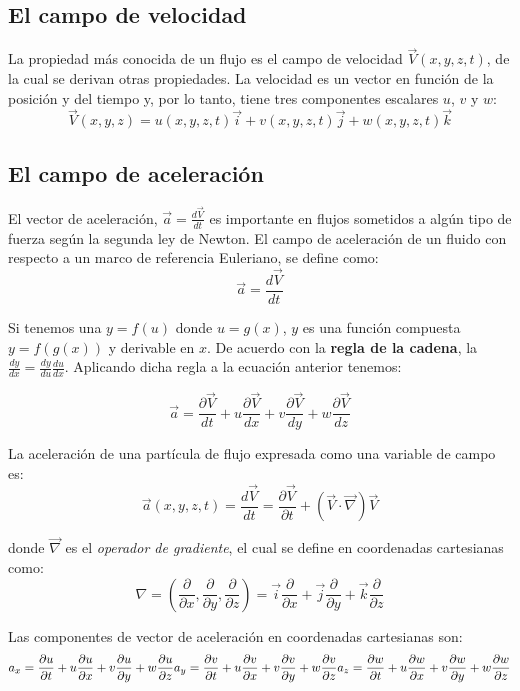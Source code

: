 \documentclass[10pt, oneside]{article}
\begin{document}
\subsection{El campo de velocidad}
La propiedad más conocida de un flujo es el campo de velocidad $\vec{V}(x,y,z,t)$, de la cual se derivan otras propiedades. La velocidad es un vector en función de la posición y del tiempo y, por lo tanto, tiene tres componentes escalares $u$, $v$ y $w$:
$$
\vec{V}(x,y,z)=u(x,y,z,t)\vec{i} + v(x,y,z,t)\vec{j} + w(x,y,z,t)\vec{k}
$$

\subsection{El campo de aceleración}
El vector de aceleración, $\vec{a}=\frac{d \vec{V}}{dt}$ es importante en flujos sometidos a algún tipo de fuerza según la segunda ley de Newton. El campo de aceleración de un fluido con respecto a un marco de referencia Euleriano, se define como:
$$
\vec{a}=\frac{d \vec{V}}{dt}
$$

Si tenemos una  $y=f(u)$ donde $u=g(x)$, $y$ es una función compuesta $y=f(g(x))$ y derivable en $x$. De acuerdo con la \textbf{regla de la cadena}, la $\frac{dy}{dx}=\frac{dy}{du} \frac{du}{dx}$. Aplicando dicha regla a la ecuación anterior tenemos: 

$$
\vec{a}=\frac{\partial \vec{V}}{dt} + u\frac{\partial \vec{V}}{dx} + v\frac{\partial \vec{V}}{dy} + w\frac{\partial \vec{V}}{dz}
$$

La aceleración de una partícula de flujo expresada como una variable de campo es:
\begin{equation}
\vec a(x,y,z,t) = \frac{d \vec{V}}{dt} = \frac{\partial \vec{V}}{\partial t} + (\vec{V} \cdot \vec{\nabla})\vec{V}
\label{ace}
\end{equation}

donde $\vec{\nabla}$ es el \emph{operador de gradiente}, el cual se define en coordenadas cartesianas como:
$$
\nabla = \left( \frac{\partial}{\partial x} , \frac{\partial}{\partial y}, \frac{\partial}{\partial z} \right) = \vec{i}\frac{\partial}{\partial x} +\vec{j}\frac{\partial}{\partial y}  + \vec{k}\frac{\partial}{\partial z}
$$

Las componentes de vector de aceleración en coordenadas cartesianas son:
$$
a_x = \frac{\partial u}{\partial t} + u\frac{\partial u}{\partial x} + v\frac{\partial u}{\partial y} + w\frac{\partial u}{\partial z} \\
a_y = \frac{\partial v}{\partial t} + u\frac{\partial v}{\partial x} + v\frac{\partial v}{\partial y} + w\frac{\partial v}{\partial z} \\ 
a_z = \frac{\partial w}{\partial t} + u\frac{\partial w}{\partial x} + v\frac{\partial w}{\partial y} + w\frac{\partial w}{\partial z}  
$$
\end{document}
